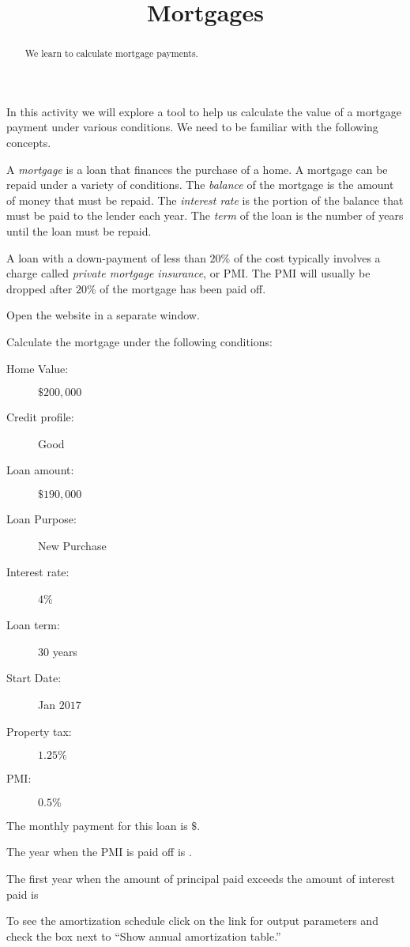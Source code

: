 \documentclass{ximera}
\title{Mortgages}
\begin{document}
\begin{abstract}
We learn to calculate mortgage payments.
\end{abstract}
\maketitle

In this activity we will explore a tool to help us calculate the value of a mortgage payment under various conditions. We need to be familiar with the following concepts.  

A \emph{mortgage} is a loan that finances the purchase of a home. A mortgage can be repaid under a variety of conditions. The \emph{balance} of the mortgage is the amount of money that must be repaid. The \emph{interest rate} is the portion of the balance that must be paid to the lender each year. The \emph{term} of the loan is the number of years until the loan must be repaid.

A loan with a down-payment of less than $20\%$ of the cost typically involves a charge called \emph{private mortgage insurance}, or PMI. The PMI will usually be dropped after $20\%$ of the mortgage has been paid off.

Open the website  in a separate window. 

\begin{question}
Calculate the mortgage under the following conditions:
\begin{description}
\item[Home Value:] $\$200,000$
\item[Credit profile:] Good
\item[Loan amount:] $\$190,000$
\item[Loan Purpose:] New Purchase
\item[Interest rate:] $4$\%
\item[Loan term:] $30$ years
\item[Start Date:] Jan $2017$
\item[Property tax:] $1.25\%$
\item[PMI:] $0.5\%$
\end{description}

The monthly payment for this loan is $\$$.

The year when the PMI is paid off is .

The first year when the amount of principal paid exceeds the amount of interest paid is 

\begin{hint}
To see the amortization schedule click on the link for output parameters and check the box next to ``Show annual amortization table.''
\end{hint}
\end{question}
\end{document}
